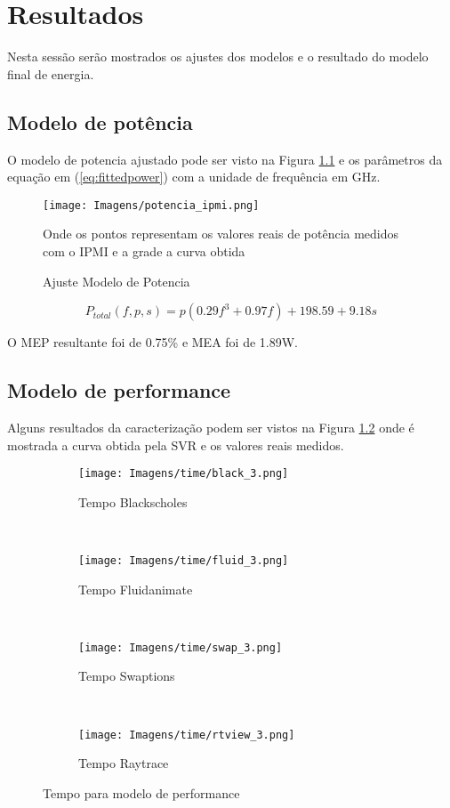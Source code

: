 \chapter{Resultados} \label{cap:resultados}

Nesta sessão serão mostrados os ajustes dos modelos e o resultado do modelo final de energia.

\section{Modelo de potência}

O modelo de potencia ajustado pode ser visto na Figura \ref{fig:pot_ipmi} e os parâmetros da equação em (\ref{eq:fittedpower}) com a unidade de frequência em GHz.

\begin{figure}[H]
\centering
\texttt{[image: Imagens/potencia\_ipmi.png]}
\caption{Ajuste Modelo de Potencia}{Onde os pontos representam os valores reais de potência medidos com o IPMI e a grade a curva obtida}
\label{fig:pot_ipmi}
\end{figure}

\begin{equation} 
P_{total}(f,p,s)=p(0.29f^3+0.97f)+198.59+9.18s \label{eq:fittedpower}
\end{equation}

O MEP resultante foi de 0.75\% e MEA foi de 1.89W.

\section{Modelo de performance} \label{sec:ajuste_perf}

Alguns resultados da caracterização podem ser vistos na Figura \ref{fig:tempos} onde é mostrada a curva obtida pela SVR e os valores reais medidos.

\begin{figure}[H]
	\centering
	\begin{subfigure}[t]{0.5\textwidth}
		\centering
		\texttt{[image: Imagens/time/black\_3.png]}
		\caption{Tempo Blackscholes}
	\end{subfigure}%
	~ 
	\begin{subfigure}[t]{0.5\textwidth}
		\centering
		\texttt{[image: Imagens/time/fluid\_3.png]}
		\caption{Tempo Fluidanimate}
	\end{subfigure}
	\\
	\centering
	\begin{subfigure}[t]{0.5\textwidth}
		\centering
		\texttt{[image: Imagens/time/swap\_3.png]}
		\caption{Tempo Swaptions}
	\end{subfigure}%
	~
	\begin{subfigure}[t]{0.5\textwidth}
		\centering
		\texttt{[image: Imagens/time/rtview\_3.png]}
		\caption{Tempo Raytrace}
	\end{subfigure}
	
	\caption{Tempo para modelo de performance}
	\label{fig:tempos}
\end{figure}

